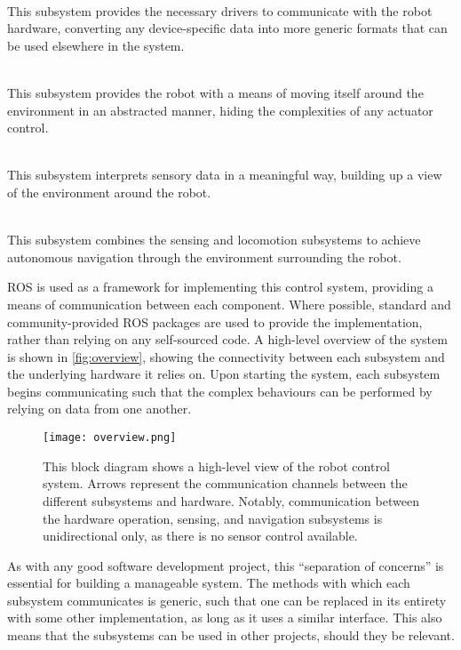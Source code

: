 \begin{description}[labelindent=\parindent]
	\item[Hardware Operations] \hfill \\
	This subsystem provides the necessary drivers to communicate with the robot hardware, converting any device-specific data into more generic formats that can be used elsewhere in the system.

	\item[Locomotion] \hfill \\
	This subsystem provides the robot with a means of moving itself around the environment in an abstracted manner, hiding the complexities of any actuator control.

	\item[Sensing] \hfill \\
	This subsystem interprets sensory data in a meaningful way, building up a view of the environment around the robot.

	\item[Navigation] \hfill \\
	This subsystem combines the sensing and locomotion subsystems to achieve autonomous navigation through the environment surrounding the robot.
\end{description}

ROS is used as a framework for implementing this control system, providing a means of communication between each component. Where possible, standard and community-provided ROS packages are used to provide the implementation, rather than relying on any self-sourced code. A high-level overview of the system is shown in \autoref{fig:overview}, showing the connectivity between each subsystem and the underlying hardware it relies on. Upon starting the system, each subsystem begins communicating such that the complex behaviours can be performed by relying on data from one another.

\begin{figure}[!h]
	\centering
	\texttt{[image: overview.png]}
	\caption{This block diagram shows a high-level view of the robot control system. Arrows represent the communication channels between the different subsystems and hardware. Notably, communication between the hardware operation, sensing, and navigation subsystems is unidirectional only, as there is no sensor control available.}
	\label{fig:overview}
\end{figure}

As with any good software development project, this ``separation of concerns'' is essential for building a manageable system. The methods with which each subsystem communicates is generic, such that one can be replaced in its entirety with some other implementation, as long as it uses a similar interface. This also means that the subsystems can be used in other projects, should they be relevant.

